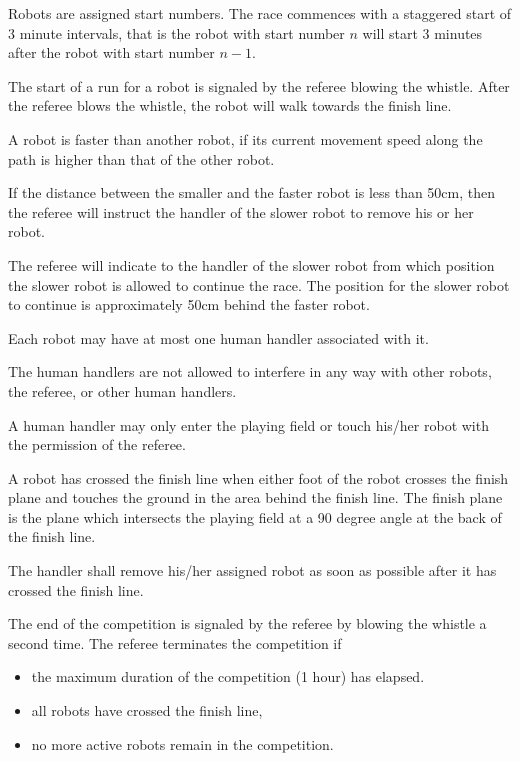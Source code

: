 \documentclass[12pt]{hurocup}
\begin{document}
\begin{lawlist}[MR]

\item Robots are assigned start numbers. The race commences with a
  staggered start of 3 minute intervals, that is the robot with start
  number $n$ will start 3 minutes after the robot with start number
  $n-1$.

\item The start of a run for a robot is signaled by the referee
  blowing the whistle. After the referee blows the whistle, the robot
  will walk towards the finish line.

\item \label{catch-up} A robot is faster than another robot, if its
  current movement speed along the path is higher than that of the
  other robot.

\item If the distance between the smaller and the faster robot is less
  than 50cm, then the referee will instruct the handler of the slower
  robot to remove his or her robot.

\item The referee will indicate to the handler of the slower robot
  from which position the slower robot is allowed to continue the
  race. The position for the slower robot to continue is approximately
  50cm behind the faster robot.

\item Each robot may have at most one human handler associated with
  it.

\item \label{handler1} The human handlers are not allowed to
  interfere in any way with other robots, the referee, or other human
  handlers.

\item \label{handler2} A human handler may only enter the playing
  field or touch his/her robot with the permission of the referee.

\item A robot has crossed the finish line when either
  foot of the robot crosses the finish plane and touches the ground in
  the area behind the finish line. The finish plane is the plane which
  intersects the playing field at a 90 degree angle at the back of the
  finish line.

\item The handler shall remove his/her assigned robot as soon as
  possible after it has crossed the finish line.

\item The end of the competition is signaled by the referee by blowing
  the whistle a second time. The referee terminates the competition
  if
  \begin{itemize}
    \item the maximum duration of the competition (1 hour) has
      elapsed.
  \item all robots have crossed the finish line,
  \item no more active robots remain in the competition.
  \end{itemize}

\end{lawlist}
\end{document}
